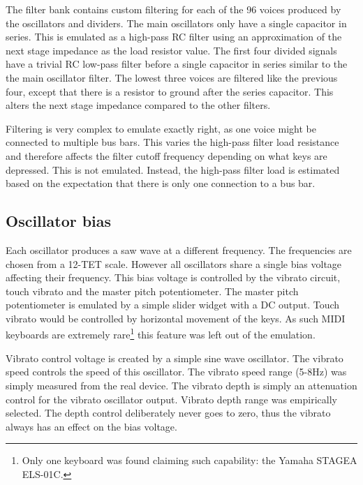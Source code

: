 \documentclass[11pt,a4paper]{article}
\begin{document}
The filter bank contains custom filtering for each of the 96 voices produced by the oscillators and dividers. The main oscillators only have a single capacitor in series. This is emulated as a high-pass RC filter using an approximation of the next stage impedance as the load resistor value. The first four divided signals have a trivial RC low-pass filter before a single capacitor in series similar to the the main oscillator filter. The lowest three voices are filtered like the previous four, except that there is a resistor to ground after the series capacitor. This alters the next stage impedance compared to the other filters.

Filtering is very complex to emulate exactly right, as one voice might be connected to multiple bus bars. This varies the high-pass filter load resistance and therefore affects the filter cutoff frequency depending on what keys are depressed. This is not emulated. Instead, the high-pass filter load is estimated based on the expectation that there is only one connection to a bus bar.




\subsection{Oscillator bias}
\label{section:oscillator-bias}

Each oscillator produces a saw wave at a different frequency. The frequencies are chosen from a 12-TET scale. However all oscillators share a single bias voltage affecting their frequency. This bias voltage is controlled by the vibrato circuit, touch vibrato and the master pitch potentiometer. The master pitch potentiometer is emulated by a simple slider widget with a DC output. Touch vibrato would be controlled by horizontal movement of the keys. As such MIDI keyboards are extremely rare\footnote{Only one keyboard was found claiming such capability: the Yamaha STAGEA ELS-01C.} this feature was left out of the emulation.

Vibrato control voltage is created by a simple sine wave oscillator. The vibrato speed controls the speed of this oscillator. The vibrato speed range (5-8Hz) was simply measured from the real device. The vibrato depth is simply an attenuation control for the vibrato oscillator output. Vibrato depth range was empirically selected. The depth control deliberately never goes to zero, thus the vibrato always has an effect on the bias voltage.
\end{document}
